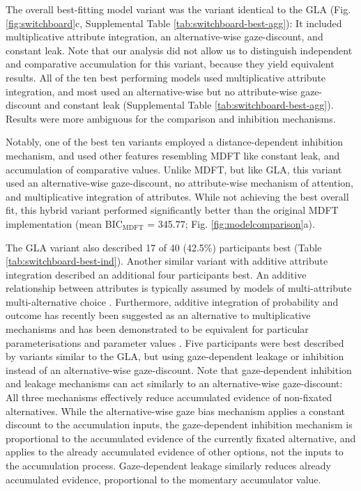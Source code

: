 \documentclass[11pt, a4paper]{article}
\begin{document}
The overall best-fitting model variant was the variant identical to the GLA (Fig. \ref{fig:switchboard}c, Supplemental Table \ref{tab:switchboard-best-agg}): It included multiplicative attribute integration, an alternative-wise gaze-discount, and constant leak. Note that our analysis did not allow us to distinguish independent and comparative accumulation for this variant, because they yield equivalent results. All of the ten best performing models used multiplicative attribute integration, and most used an alternative-wise but no attribute-wise gaze-discount and constant leak (Supplemental Table \ref{tab:switchboard-best-agg}). Results were more ambiguous for the comparison and inhibition mechanisms.

Notably, one of the best ten variants employed a distance-dependent inhibition mechanism, and used other features resembling MDFT like constant leak, and accumulation of comparative values. Unlike MDFT, but like GLA, this variant used an alternative-wise gaze-discount, no attribute-wise mechanism of attention, and multiplicative integration of attributes. While not achieving the best overall fit, this hybrid variant performed significantly better than the original MDFT implementation (mean BIC$_{\text{MDFT}}$ = 345.77; Fig. \ref{fig:modelcomparison}a).

The GLA variant also described 17 of 40 (42.5\%) participants best (Table \ref{tab:switchboard-best-ind}). Another similar variant with additive attribute integration described an additional four participants best. An additive relationship between attributes is typically assumed by models of multi-attribute multi-alternative choice \autocite{roe2001MultialternativeDecisionField,usher2004LossAversionInhibition}. Furthermore, additive integration of probability and outcome has recently been suggested as an alternative to multiplicative mechanisms and has been demonstrated to be equivalent for particular parameterisations and parameter values \autocite{rouault2019PrefrontalMechanismsCombining}. Five participants were best described by variants similar to the GLA, but using gaze-dependent leakage or inhibition instead of an alternative-wise gaze-discount. Note that gaze-dependent inhibition and leakage mechanisms can act similarly to an alternative-wise gaze-discount: All three mechanisms effectively reduce accumulated evidence of non-fixated alternatives. While the alternative-wise gaze bias mechanism applies a constant discount to the accumulation inputs, the gaze-dependent inhibition mechanism is proportional to the accumulated evidence of the currently fixated alternative, and applies to the already accumulated evidence of other options, not the inputs to the accumulation process. Gaze-dependent leakage similarly reduces already accumulated evidence, proportional to the momentary accumulator value.
\end{document}
